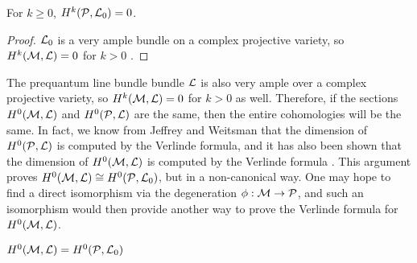 \begin{corollary}
	For $k\geq 0$, $H^k(\mathcal{P},\mathcal{L}_0) =0$.
\end{corollary}
\begin{proof}
	$\mathcal{L}_0$ is a very ample bundle on a complex projective variety, so $H^k(\mathcal{M},\mathcal{L})=0$ for $k>0$ \cite[III, Prop 2.6.1]{grothendieck_elements_1960}.
\end{proof}
The prequantum line bundle bundle $\mathcal{L}$ is also very ample over a complex projective variety, so $H^k(\mathcal{M},\mathcal{L})=0$ for $k>0$ as well. Therefore, if the sections $H^0(\mathcal{M},\mathcal{L})$ and $H^0(\mathcal{P},\mathcal{L})$ are the same, then the entire cohomologies will be the same. In fact, we know from Jeffrey and Weitsman that the dimension of $H^0(\mathcal{P},\mathcal{L})$ is computed by the Verlinde formula, and it has also been shown that the dimension of $H^0(\mathcal{M},\mathcal{L})$ is computed by the Verlinde formula \cite{faltings_proof_1994}\cite{schottenloher_mathematical_2008}. This argument proves $H^0(\mathcal{M},\mathcal{L})\cong H^0(\mathcal{P},\mathcal{L}_0)$, but in a non-canonical way. One may hope to find a direct isomorphism via the degeneration $\phi:\mathcal{M}\to\mathcal{P}$, and such an isomorphism would then provide another way to prove the Verlinde formula for $H^0(\mathcal{M},\mathcal{L})$.
\begin{theorem}
	$H^0(\mathcal{M},\mathcal{L}) = H^0(\mathcal{P},\mathcal{L}_0)$
\end{theorem}
